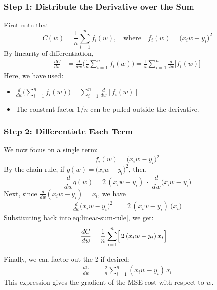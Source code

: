 \documentclass{article}
\begin{document}
\subsubsection{Step 1: Distribute the Derivative over the Sum}\label{sec:linreg-step1}

\noindent First note that
\[
    C(w) 
    = \frac{1}{n} \sum_{i=1}^{n} f_i(w), 
    \quad\text{where}\quad 
    f_i(w) = {\bigl(x_i w - y_i\bigr)}^2
\]
By linearity of differentiation,
\begin{align}
    \frac{dC}{dw}
    &= \frac{d}{dw} \biggl(\frac{1}{n} \sum_{i=1}^{n} f_i(w)\biggr) 
    = \frac{1}{n} \sum_{i=1}^{n} \frac{d}{dw}\bigl[f_i(w)\bigr]
    \label{eq:linear-sum-rule}
\end{align}
\noindent Here, we have used:
\begin{itemize}
    \item \(\tfrac{d}{dw}\bigl(\sum_{i=1}^n f_i(w)\bigr) = \sum_{i=1}^n \tfrac{d}{dw}[f_i(w)]\)
    \item The constant factor \(1/n\) can be pulled outside the derivative.
\end{itemize}

\vspace{0.5em}

\subsubsection{Step 2: Differentiate Each Term}\label{sec:linreg-step2}

\noindent We now focus on a single term:
\[
    f_i(w) = {\bigl(x_i w - y_i\bigr)}^2
\]
By the chain rule, if \(g(w) = {\bigl(x_i w - y_i\bigr)}^2\), then
\[
    \frac{d}{dw} g(w)
    = 2\,(x_i w - y_i)\;\cdot\;\frac{d}{dw}\bigl(x_i w - y_i\bigr)
\]
\noindent Next, since \(\frac{d}{dw}(x_i w - y_i) = x_i\), we have
\begin{align}
    \frac{d}{dw}{\bigl(x_i w - y_i\bigr)}^2
    &= 2\,(x_i w - y_i)\;\bigl(x_i\bigr)
    \label{eq:linreg-chain}
\end{align}
\noindent Substituting back into\eqref{eq:linear-sum-rule}, we get:
\begin{align}
    \frac{dC}{dw}
    &= \frac{1}{n} \sum_{i=1}^{n} \Bigl[\,2\,(x_i w - y_i)\,x_i\Bigr]
\end{align}

\vspace{0.5em}

\noindent Finally, we can factor out the \(2\) if desired:
\begin{align}
    \frac{dC}{dw}
    &= \frac{2}{n} \sum_{i=1}^{n} (x_i w - y_i)\,x_i
    \label{eq:linreg-final}
\end{align}
\noindent This expression gives the gradient of the MSE cost with respect to \(w\).  
\end{document}
